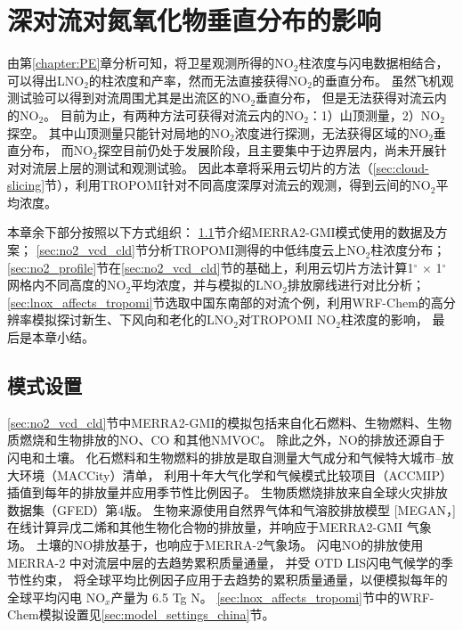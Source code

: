 
\chapter{深对流对氮氧化物垂直分布的影响} \label{sec:effects_on_nox_profile}

由第\ref{chapter:PE}章分析可知，将卫星观测所得的NO$_2$柱浓度与闪电数据相结合，
可以得出LNO$_2$的柱浓度和产率，然而无法直接获得NO$_2$的垂直分布。
虽然飞机观测试验可以得到对流周围尤其是出流区的NO$_2$垂直分布\citep{Barth.2019}，
但是无法获得对流云内的NO$_2$。
目前为止，有两种方法可获得对流云内的NO$_2$：1）山顶测量，2）NO$_2$探空。
其中山顶测量只能针对局地的NO$_2$浓度进行探测，无法获得区域的NO$_2$垂直分布\citep{Reiter.1970}，
而NO$_2$探空目前仍处于发展阶段，且主要集中于边界层内\citep{Sluis.2010}，尚未开展针对对流层上层的测试和观测试验。
因此本章将采用云切片的方法（\ref{sec:cloud-slicing}节），利用TROPOMI针对不同高度深厚对流云的观测，得到云间的NO$_2$平均浓度。

本章余下部分按照以下方式组织：
\ref{sec:model_settings_gmi}节介绍MERRA2-GMI模式使用的数据及方案；
\ref{sec:no2_vcd_cld}节分析TROPOMI测得的中低纬度云上NO$_2$柱浓度分布；
\ref{sec:no2_profile}节在\ref{sec:no2_vcd_cld}节的基础上，利用云切片方法计算1$^{\circ}$ $\times$ 1$^{\circ}$ 网格内不同高度的NO$_2$平均浓度，并与模拟的LNO$_2$排放廓线进行对比分析；
\ref{sec:lnox_affects_tropomi}节选取中国东南部的对流个例，利用WRF-Chem的高分辨率模拟探讨新生、下风向和老化的LNO$_2$对TROPOMI NO$_2$柱浓度的影响，
最后是本章小结。



\section{模式设置} \label{sec:model_settings_gmi}

\ref{sec:no2_vcd_cld}节中MERRA2-GMI的模拟包括来自化石燃料、生物燃料、生物质燃烧和生物排放的NO、CO 和其他NMVOC。
除此之外，NO的排放还源自于闪电和土壤。
化石燃料和生物燃料的排放是取自测量大气成分和气候特大城市--放大环境（MACCity）清单\citep{Granier.2011}，
利用十年大气化学和气候模式比较项目（ACCMIP）插值到每年的排放量并应用季节性比例因子\citep{Lamarque.2010}。
生物质燃烧排放来自全球火灾排放数据集（GFED）第4版\citep{Giglio.2013}。
生物来源使用自然界气体和气溶胶排放模型 [MEGAN，\citet{Guenther.1999}]
在线计算异戊二烯和其他生物化合物的排放量，并响应于MERRA2-GMI 气象场。
土壤的NO排放基于\citet{Yienger.1995}，也响应于MERRA-2气象场。
闪电NO的排放使用 MERRA-2 中对流层中层的去趋势累积质量通量\citep{Allen.2010}，
并受 OTD LIS闪电气候学的季节性约束\citep{Cecil.2014}，
将全球平均比例因子应用于去趋势的累积质量通量，以便模拟每年的全球平均闪电 NO$_x$产量为 6.5 Tg N。
\ref{sec:lnox_affects_tropomi}节中的WRF-Chem模拟设置见\ref{sec:model_settings_china}节。

